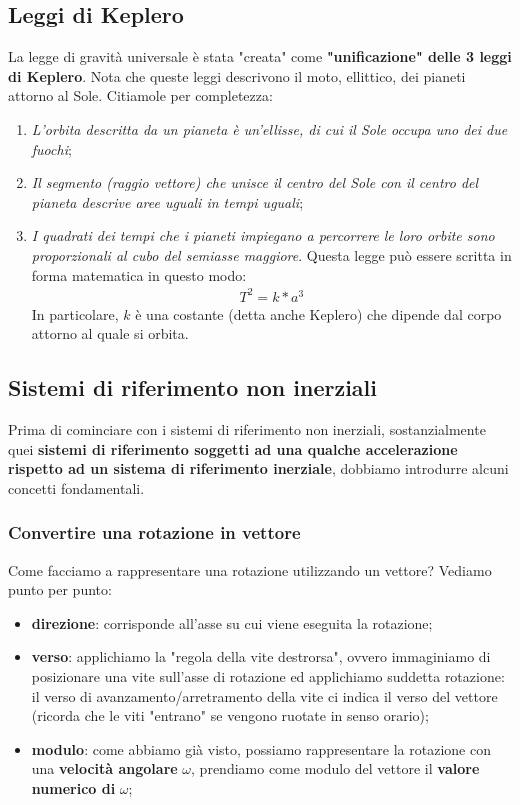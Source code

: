         \subsection{Leggi di Keplero}
            La legge di gravità universale è stata "creata" come \textbf{"unificazione" delle 3 leggi di Keplero}. Nota che queste leggi descrivono il moto, ellittico, dei pianeti attorno al Sole. Citiamole per completezza:
            \begin{enumerate}
                \item \textit{L'orbita descritta da un pianeta è un'ellisse, di cui il Sole occupa uno dei due fuochi};
                \item \textit{Il segmento (raggio vettore) che unisce il centro del Sole con il centro del pianeta descrive aree uguali in tempi uguali};
                \item \textit{I quadrati dei tempi che i pianeti impiegano a percorrere le loro orbite sono proporzionali al cubo del semiasse maggiore}. Questa legge può essere scritta in forma matematica in questo modo:
                \begin{align*}
                    T^2=k*a^3
                \end{align*}
                In particolare, $k$ è una costante (detta anche Keplero) che dipende dal corpo attorno al quale si orbita.
            \end{enumerate}

    \subsection{Sistemi di riferimento non inerziali}
        Prima di cominciare con i sistemi di riferimento non inerziali, sostanzialmente quei \textbf{sistemi di riferimento soggetti ad una qualche accelerazione rispetto ad un sistema di riferimento inerziale}, dobbiamo introdurre alcuni concetti fondamentali.
        \subsubsection{Convertire una rotazione in vettore}
            Come facciamo a rappresentare una rotazione utilizzando un vettore? Vediamo punto per punto:
            \begin{itemize}
                \item \textbf{direzione}: corrisponde all'asse su cui viene eseguita la rotazione;
                \item \textbf{verso}: applichiamo la "regola della vite destrorsa", ovvero immaginiamo di posizionare una vite sull'asse di rotazione ed applichiamo suddetta rotazione: il verso di avanzamento/arretramento della vite ci indica il verso del vettore (ricorda che le viti "entrano" se vengono ruotate in senso orario);
                \item \textbf{modulo}: come abbiamo già visto, possiamo rappresentare la rotazione con una \textbf{velocità angolare} $\omega$, prendiamo come modulo del vettore il \textbf{valore numerico di }$\omega$;
            \end{itemize}

